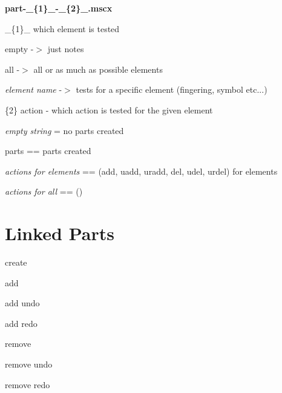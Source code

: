 {\bfseries part-\/\+\_\+\{1\}\+\_\+-\/\+\_\+\{2\}\+\_\+.\+mscx}

\+\_\+\{1\}\+\_\+ which element is tested


\begin{DoxyItemize}
\item {\ttfamily empty} -\/$>$ just notes
\item {\ttfamily all} -\/$>$ all or as much as possible elements
\item {\itshape element name} -\/$>$ tests for a specific element (fingering, symbol etc...)
\end{DoxyItemize}

\{2\} action -\/ which action is tested for the given element


\begin{DoxyItemize}
\item {\itshape empty string} = no parts created
\item {\ttfamily parts} == parts created
\item {\itshape actions for elements} == (add, uadd, uradd, del, udel, urdel) for elements
\item {\itshape actions for all} == ()
\end{DoxyItemize}

\section*{Linked Parts }


\begin{DoxyEnumerate}
\item create
\item add
\item add undo
\item add redo
\item remove
\item remove undo
\item remove redo
\end{DoxyEnumerate}


